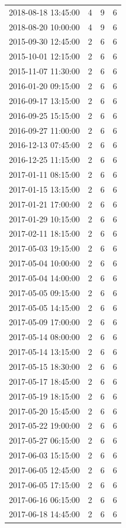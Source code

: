 \begin{tabular}{lrrr}
2018-08-18 13:45:00 & 4 & 9 & 6 \\
2018-08-20 10:00:00 & 4 & 9 & 6 \\
2015-09-30 12:45:00 & 2 & 6 & 6 \\
2015-10-01 12:15:00 & 2 & 6 & 6 \\
2015-11-07 11:30:00 & 2 & 6 & 6 \\
2016-01-20 09:15:00 & 2 & 6 & 6 \\
2016-09-17 13:15:00 & 2 & 6 & 6 \\
2016-09-25 15:15:00 & 2 & 6 & 6 \\
2016-09-27 11:00:00 & 2 & 6 & 6 \\
2016-12-13 07:45:00 & 2 & 6 & 6 \\
2016-12-25 11:15:00 & 2 & 6 & 6 \\
2017-01-11 08:15:00 & 2 & 6 & 6 \\
2017-01-15 13:15:00 & 2 & 6 & 6 \\
2017-01-21 17:00:00 & 2 & 6 & 6 \\
2017-01-29 10:15:00 & 2 & 6 & 6 \\
2017-02-11 18:15:00 & 2 & 6 & 6 \\
2017-05-03 19:15:00 & 2 & 6 & 6 \\
2017-05-04 10:00:00 & 2 & 6 & 6 \\
2017-05-04 14:00:00 & 2 & 6 & 6 \\
2017-05-05 09:15:00 & 2 & 6 & 6 \\
2017-05-05 14:15:00 & 2 & 6 & 6 \\
2017-05-09 17:00:00 & 2 & 6 & 6 \\
2017-05-14 08:00:00 & 2 & 6 & 6 \\
2017-05-14 13:15:00 & 2 & 6 & 6 \\
2017-05-15 18:30:00 & 2 & 6 & 6 \\
2017-05-17 18:45:00 & 2 & 6 & 6 \\
2017-05-19 18:15:00 & 2 & 6 & 6 \\
2017-05-20 15:45:00 & 2 & 6 & 6 \\
2017-05-22 19:00:00 & 2 & 6 & 6 \\
2017-05-27 06:15:00 & 2 & 6 & 6 \\
2017-06-03 15:15:00 & 2 & 6 & 6 \\
2017-06-05 12:45:00 & 2 & 6 & 6 \\
2017-06-05 17:15:00 & 2 & 6 & 6 \\
2017-06-16 06:15:00 & 2 & 6 & 6 \\
2017-06-18 14:45:00 & 2 & 6 & 6 \\

\end{tabular}

